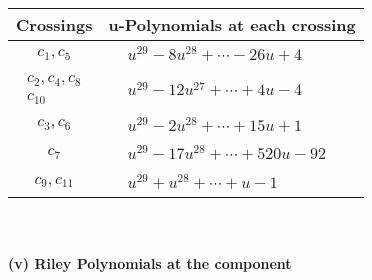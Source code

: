 \documentclass[1p]{elsarticle_modified}
\theoremstyle{definition}
\begin{document}
\begin{tabular}{m{50pt}|m{274pt}}
Crossings & \hspace{64pt}u-Polynomials at each crossing \\
\hline $$\begin{aligned}c_{1},c_{5}\end{aligned}$$&$\begin{aligned}
&u^{29}-8 u^{28}+\cdots-26 u+4
\end{aligned}$\\
\hline $$\begin{aligned}c_{2},c_{4},c_{8}\\c_{10}\end{aligned}$$&$\begin{aligned}
&u^{29}-12 u^{27}+\cdots+4 u-4
\end{aligned}$\\
\hline $$\begin{aligned}c_{3},c_{6}\end{aligned}$$&$\begin{aligned}
&u^{29}-2 u^{28}+\cdots+15 u+1
\end{aligned}$\\
\hline $$\begin{aligned}c_{7}\end{aligned}$$&$\begin{aligned}
&u^{29}-17 u^{28}+\cdots+520 u-92
\end{aligned}$\\
\hline $$\begin{aligned}c_{9},c_{11}\end{aligned}$$&$\begin{aligned}
&u^{29}+u^{28}+\cdots+u-1
\end{aligned}$\\
\hline
\end{tabular}\\~\\
\newpage\renewcommand{\arraystretch}{1}
\flushleft \textbf{(v) Riley Polynomials at the component}\newline \\
\end{document}
